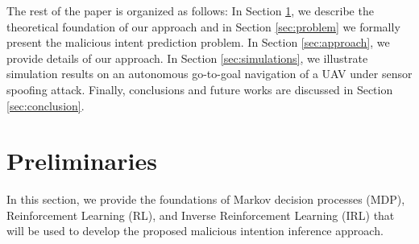 \documentclass[letterpaper, 10 pt, conference]{ieeeconf}  %
\begin{document}
The rest of the paper is organized as follows: In Section \ref{sec:Preliminaries}, we describe the theoretical foundation of our approach and in Section \ref{sec:problem} we formally present the malicious intent prediction problem. In Section \ref{sec:approach}, we provide details of our approach. In Section \ref{sec:simulations}, we illustrate simulation results on an autonomous go-to-goal navigation of a UAV under sensor spoofing attack. Finally, conclusions and future works are discussed in Section \ref{sec:conclusion}.

\section{Preliminaries}\label{sec:Preliminaries}
In this section, we provide the foundations of Markov decision processes (MDP), Reinforcement Learning (RL), and Inverse Reinforcement Learning (IRL) that will be used to develop the proposed malicious intention inference approach.
\end{document}
